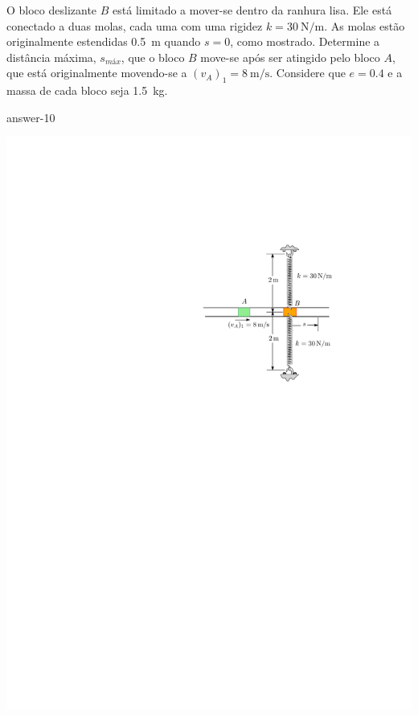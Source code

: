 \item O bloco deslizante $B$ está limitado a mover-se dentro da ranhura lisa. Ele está conectado a duas molas, cada uma com uma rigidez $k=\SI{30}{\newton/\meter}$. As molas estão originalmente estendidas \SI{.5}{\meter} quando $s=0$, como mostrado. Determine a distância máxima, $s_{\textit{máx}}$, que o bloco $B$ move-se após ser atingido pelo bloco $A$, que está originalmente movendo-se a $(v_{A})_{1}=\SI{8}{\meter/\second}$. Considere que $e=0.4$ e a massa de cada bloco seja \SI{1.5}{\kilogram}.

{answer-10}

\vspace{-7.4cm}
\begin{flushright}
	\includegraphics[scale=1.2]{images/draw_13}
\end{flushright}